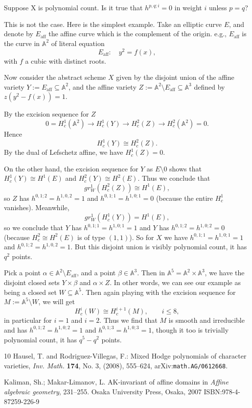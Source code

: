 \documentclass[12pt]{article}
\DeclareMathOperator{\aff}{aff}
\newcommand{\A}{\mathbb A}
\begin{document}
\section{}

Suppose X is polynomial count. Is it true that $h^{p,q;i}=0$ in weight
$i$ unless $p=q$?

This is not the case. Here is the simplest example.
Take an elliptic curve $E$, and denote by $E_{\aff}$ the affine curve which is
the complement of the origin. e.g., $E_{\aff}$ is the curve in $\A^2$ of literal
equation 
$$
E_{\aff}:\quad y^2 = f(x),
$$
with $f$ a cubic with distinct roots. 

Now consider the abstract scheme $X$ given by the disjoint union of
the affine variety $Y:=E_{\aff}\subseteq \A^2$, and the affine variety
$Z:=\A^2 \setminus E_{\aff}\subseteq \A^3$ defined by $z(y^2-f(x))=1$.

By the excision sequence for $Z$
$$
0=H^1_c(\A^2) \rightarrow H^1_c(Y) \rightarrow H^2_c(Z) \rightarrow
H^2_c(\A^2)=0.
$$
Hence
$$
H^1_c(Y) \cong H^2_c(Z).
$$
By the dual of Lefschetz affine, we have $H^1_c(Z)= 0$.

On the other hand, the excision sequence for $Y$ as $E \setminus 0$
shows that $H^1_c(Y) \cong H^1(E)$ and $H^2_c(Y) \cong H^2(E)$.  Thus
we conclude that
$$
gr_W^1(H^2_c(Z)) \cong H^1(E),
$$
so $Z$ has $h^{0,1;2}=h^{1,0,2} = 1$ and 
$h^{0,1;1}=h^{1,0;1} =0$ (because the entire $H^1_c$ vanishes).
Meanwhile, 
$$
gr_W^1(H^1_c(Y)) =H^1(E),
$$
so we conclude that $Y$ has $h^{0,1;1}=h^{1,0;1}=1$ and $Y$ has
$h^{0,1;2}=h^{1,0;2}=0$ (because $H^2_c \cong H^2(E)$ is of type
$(1,1)$).  So for $X$ we have $h^{0,1;1}=h^{1,0;1}=1$ and
$h^{0,1;2}=h^{1,0,2} = 1$. But this disjoint union is visibly
polynomial count, it has $q^2$ points.

Pick a point  $\alpha \in \A^2 \setminus E_{\aff}$, and a point
$\beta \in \A^3$. Then in $\A^5 = \A^2 \times \A^3$, we have the disjoint closed sets
$Y\times \beta$ and $\alpha \times Z$. In other words,
we can see our example as being a closed set $W\subseteq \A^5$. Then again playing 
with the excision sequence for $M:=\A^5 \setminus W$, we will get
$$
H^i_c(W) \cong  H^{i+1}_c(M),\qquad i \le 8,
$$
in particular for $i=1$ and $i=2$. Thus we find that $M$ is smooth and
irreducible and has $h^{0,1;2}=h^{1,0;2}=1$ and
$h^{0,1;3}=h^{1,0;3}=1$, though it too is trivially polynomial count,
it has $q^5 -q^2$ points.

\begin{thebibliography}{10}
{\sc  Hausel, T. {\rm and}  Rodriguez-Villegas, F.}: {Mixed Hodge
polynomials
of character varieties}, {\em Inv. Math.}   { \bf 174}, No. 3, (2008), 555--624, arXiv:{\tt math.AG/0612668}.

{\sc Kaliman, Sh.; Makar-Limanov, L.}
{ AK-invariant of affine domains}
in {\em Affine algebraic geometry}, 231--255.
Osaka University Press, Osaka, 2007
ISBN:978-4-87259-226-9


\end{thebibliography}
\end{document}
